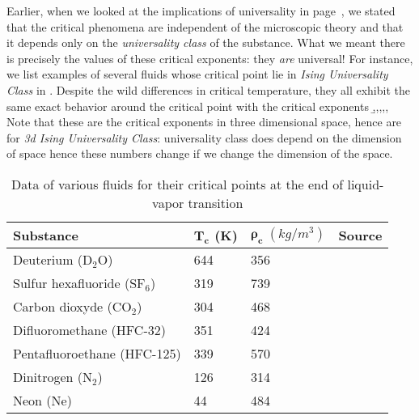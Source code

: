 Earlier, when we looked at the implications of universality in page~\pageref{items: implications of universality}, we stated that the critical phenomena are independent of the microscopic theory and that it depends only on the \emph{universality class} of the substance. What we meant there is precisely the values of these critical exponents: they \emph{are} universal! For instance, we list examples of several fluids whose critical point lie in \emph{Ising Universality Class} in \tabref{\ref{table: critical data of various fluids}}. Despite the wild differences in critical temperature, they all exhibit the same exact behavior around the critical point with the critical exponents
\be 
\label{eq: critical exponents for 3d Ising}
\a{}\;,\quad\b{}\;,\quad\g{}\;,\quad\de{}\;,\quad\eta{}\;,\quad\nu{}
\ee 
Note that these are the critical exponents in three dimensional space, hence are for \emph{3d Ising Universality Class}: universality class does depend on the dimension of space hence these numbers change if we change the dimension of the space.

\begin{table}
	\centering
	\caption[Critical data for various fluids]{\label{table: critical data of various fluids}Data of various fluids for their critical points at the end of liquid-vapor transition}
	\begin{tabular}{llll}
		\hline\hline 
		\textbf{Substance} & $\bm{T_c}$ (K)& $\bm{\rho_c} \;(kg/m^3)$ &\textbf{Source}
		\\\hline
		Deuterium (D$_2$O) & 644 & 356   &\cite{sullivan2000small}
		\\
		Sulfur hexafluoride (SF$_6$) & 319  & 739 & \cite{PhysRevE.59.1795}
		\\
		Carbon dioxyde (CO$_2$) & 304 & 468 & \cite{PhysRevB.58.12038}
		\\
		Difluoromethane (HFC-32) & 351 & 424 & \cite{kuwabara1995vapor}
		\\
		Pentafluoroethane (HFC-125) &  339 & 570 & \cite{kuwabara1995vapor}
		\\
		Dinitrogen (N$_2$) &126& 314&\cite{PhysRevB.30.274}
		\\
		Neon (Ne)&44&484&\cite{PhysRevB.30.274}
		\\\hline\hline 
	\end{tabular}
\end{table}

